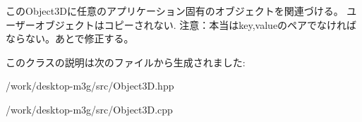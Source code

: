 このObject3Dに任意のアプリケーション固有のオブジェクトを関連づける。 ユーザーオブジェクトはコピーされない. 注意：本当はkey,valueのペアでなければならない。あとで修正する。 

このクラスの説明は次のファイルから生成されました:\begin{CompactItemize}
\item 
/work/desktop-m3g/src/Object3D.hpp\item 
/work/desktop-m3g/src/Object3D.cpp\end{CompactItemize}
